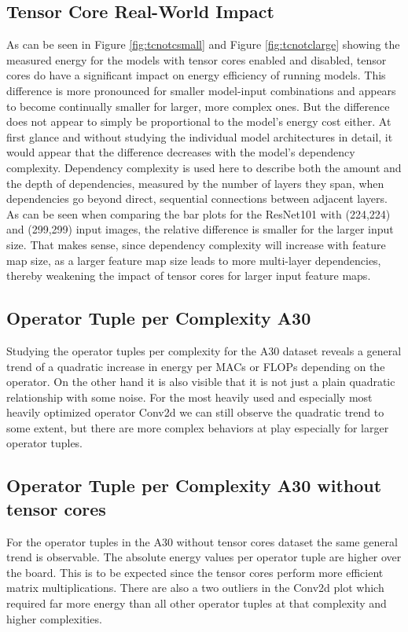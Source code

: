 \documentclass[conference]{IEEEtran}
\begin{document}
\subsection{Tensor Core Real-World Impact}
As can be seen in Figure \ref{fig:tcnotcsmall} and Figure \ref{fig:tcnotclarge} showing the measured energy for the models with tensor cores enabled and disabled, tensor cores do have a significant impact on energy efficiency of running models. This difference is more pronounced for smaller model-input combinations and appears to become continually smaller for larger, more complex ones. But the difference does not appear to simply be proportional to the model's energy cost either. At first glance and without studying the individual model architectures in detail, it would appear that the difference decreases with the model's dependency complexity. Dependency complexity is used here to describe both the amount and the depth of dependencies, measured by the number of layers they span, when dependencies go beyond direct, sequential connections between adjacent layers. As can be seen when comparing the bar plots for the ResNet101 with (224,224) and (299,299) input images, the relative difference is smaller for the larger input size. That makes sense, since dependency complexity will increase with feature map size, as a larger feature map size leads to more multi-layer dependencies, thereby weakening the impact of tensor cores for larger input feature maps.

\subsection{Operator Tuple per Complexity A30}
Studying the operator tuples per complexity for the A30 dataset reveals a general trend of a quadratic increase in energy per MACs or FLOPs depending on the operator. On the other hand it is also visible that it is not just a plain quadratic relationship with some noise. For the most heavily used and especially most heavily optimized operator Conv2d we can still observe the quadratic trend to some extent, but there are more complex behaviors at play especially for larger operator tuples. 


\subsection{Operator Tuple per Complexity A30 without tensor cores}
For the operator tuples in the A30 without tensor cores dataset the same general trend is observable. The absolute energy values per operator tuple are higher over the board. This is to be expected since the tensor cores perform more efficient matrix multiplications. There are also a two outliers in the Conv2d plot which required far more energy than all other operator tuples at that complexity and higher complexities.
\end{document}
